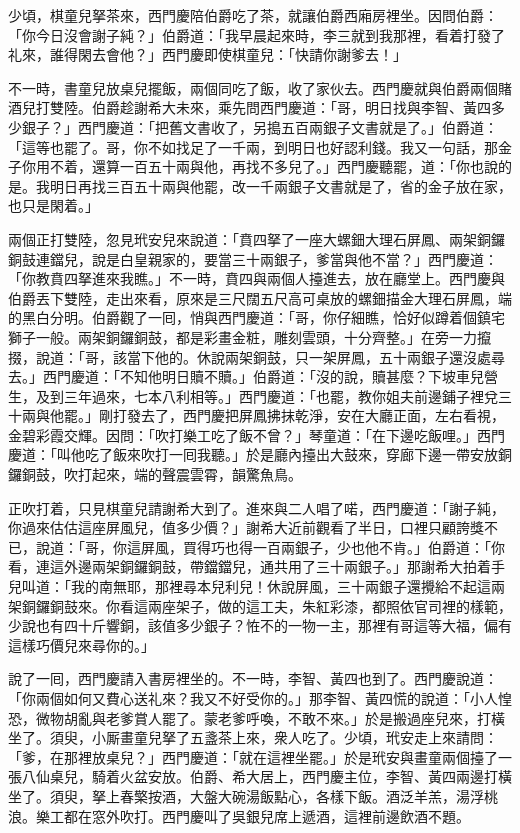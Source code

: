 少頃，棋童兒拏茶來，西門慶陪伯爵吃了茶，就讓伯爵西廂房裡坐。因問伯爵：「你今日沒會謝子純？」伯爵道：「我早晨起來時，李三就到我那裡，看着打發了礼來，誰得閑去會他？」西門慶即使棋童兒：「快請你謝爹去！」

不一時，書童兒放桌兒擺飯，兩個同吃了飯，收了家伙去。西門慶就與伯爵兩個賭酒兒打雙陸。伯爵趁謝希大未來，乘先問西門慶道：「哥，明日找與李智、黃四多少銀子？」西門慶道：「把舊文書收了，另搗五百兩銀子文書就是了。」伯爵道：「這等也罷了。哥，你不如找足了一千兩，到明日也好認利錢。我又一句話，那金子你用不着，還算一百五十兩與他，再找不多兒了。」西門慶聽罷，道：「你也說的是。我明日再找三百五十兩與他罷，改一千兩銀子文書就是了，省的金子放在家，也只是閑着。」

兩個正打雙陸，忽見玳安兒來說道：「賁四拏了一座大螺鈿大理石屏鳳、兩架銅鑼銅鼓連鐺兒，說是白皇親家的，要當三十兩銀子，爹當與他不當？」西門慶道：「你教賁四拏進來我瞧。」不一時，賁四與兩個人擡進去，放在廳堂上。西門慶與伯爵丟下雙陸，走出來看，原來是三尺闊五尺高可桌放的螺鈿描金大理石屏鳳，端的黑白分明。伯爵觀了一囘，悄與西門慶道：「哥，你仔細瞧，恰好似蹲着個鎮宅獅子一般。兩架銅鑼銅鼓，都是彩畫金粧，雕刻雲頭，十分齊整。」在旁一力攛掇，說道：「哥，該當下他的。休說兩架銅鼓，只一架屏鳳，五十兩銀子還沒處尋去。」西門慶道：「不知他明日贖不贖。」伯爵道：「沒的說，贖甚麼？下坡車兒營生，及到三年過來，七本八利相等。」西門慶道：「也罷，教你姐夫前邊鋪子裡兌三十兩與他罷。」剛打發去了，西門慶把屏鳳拂抹乾淨，安在大廳正面，左右看視，金碧彩霞交輝。因問：「吹打樂工吃了飯不曾？」琴童道：「在下邊吃飯哩。」西門慶道：「叫他吃了飯來吹打一囘我聽。」於是廳內擡出大鼓來，穿廊下邊一帶安放銅鑼銅鼓，吹打起來，端的聲震雲霄，韻驚魚鳥。

正吹打着，只見棋童兒請謝希大到了。進來與二人唱了喏，西門慶道：「謝子純，你過來估估這座屏風兒，值多少價？」謝希大近前觀看了半日，口裡只顧誇獎不已，說道：「哥，你這屏風，買得巧也得一百兩銀子，少也他不肯。」伯爵道：「你看，連這外邊兩架銅鑼銅鼓，帶鐺鐺兒，通共用了三十兩銀子。」那謝希大拍着手兒叫道：{}「我的南無耶，那裡尋本兒利兒！休說屏風，三十兩銀子還攪給不起這兩架銅鑼銅鼓來。你看這兩座架子，做的這工夫，朱紅彩漆，都照依官司裡的樣範，少說也有四十斤響銅，該值多少銀子？恠不的一物一主，那裡有哥這等大福，偏有這樣巧價兒來尋你的。」

說了一囘，西門慶請入書房裡坐的。不一時，李智、黃四也到了。西門慶說道：「你兩個如何又費心送礼來？我又不好受你的。」那李智、黃四慌的說道：「小人惶恐，微物胡亂與老爹賞人罷了。蒙老爹呼喚，不敢不來。」於是搬過座兒來，打橫坐了。須臾，小厮畫童兒拏了五盞茶上來，衆人吃了。少頃，玳安走上來請問：「爹，在那裡放桌兒？」西門慶道：「就在這裡坐罷。」於是玳安與畫童兩個擡了一張八仙桌兒，騎着火盆安放。伯爵、希大居上，西門慶主位，李智、黃四兩邊打橫坐了。須臾，拏上春檠按酒，大盤大碗湯飯點心，各樣下飯。酒泛羊羔，湯浮桃浪。樂工都在窓外吹打。西門慶叫了吳銀兒席上遞酒，這裡前邊飲酒不題。

